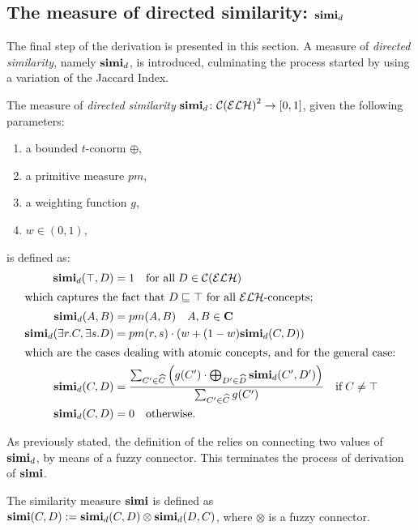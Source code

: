 \subsection{The measure of directed similarity: \(\simi_d\)}

The final step of the derivation is presented in this section. A measure of \emph{directed similarity}, namely \(\simi_d\), is introduced, culminating the process started by using a variation of the Jaccard Index.

  \begin{definition}[\(\simi_d\)]\label{simi-d}
    The measure of \emph{directed similarity} \(\mathbf{simi}_d \colon {\mathcal{C}(\mathcal{ELH})}^2 \to [0,1]\), given the following parameters:
    \begin{enumerate}
      \item a bounded \(t\)-conorm \(\oplus\),
      \item a primitive measure \(pm\),
      \item a weighting function \(g\),
      \item \(w \in (0,1)\),
    \end{enumerate}
    is defined as:
    \begin{align}
      \simi_d(\top,D) &= 1 \quad
      \text{for all}\; D \in \mathcal{C}(\mathcal{ELH}) \\
      \intertext{which captures the fact that \(D \subsume{} \top\) for all \elh-concepts;}
      \simi_d(A,B) &= pm(A,B) \quad A,B \in \Conc \\
      \simi_d(\exists{}r.C,\exists{}s.D) &=
      pm(r,s) \cdot \left(w + (1-w)\simi_d(C,D)\right) \\
      \intertext{which are the cases dealing with atomic concepts, and for the general case:}
      \simi_d(C,D) &=
      \frac{\sum_{C^\prime \in \widehat{C}}\left(g(C^\prime) \cdot \bigoplus_{D^\prime \in \widehat{D}} \simi_d(C^\prime, D^\prime)\right)}%
      {\sum_{C^\prime \in \widehat{C}}g(C^\prime)} \quad \text{if}\; C \ne \top \label{simi:general}\\
      \simi_d(C,D) &= 0 \quad \text{otherwise}.
    \end{align}
  \end{definition}

  As previously stated, the definition of the \csm \simi relies on connecting two values of \(\simi_d\), by means of a fuzzy connector. This terminates the process of derivation of \(\simi\).

  \begin{definition}[\(\simi\)]
    The similarity measure \(\simi\) is defined as \(\mathbf{simi}(C,D) := \mathbf{simi}_d(C,D) \otimes \mathbf{simi}_d(D,C)\), where \(\otimes{}\) is a fuzzy connector.
  \end{definition}

